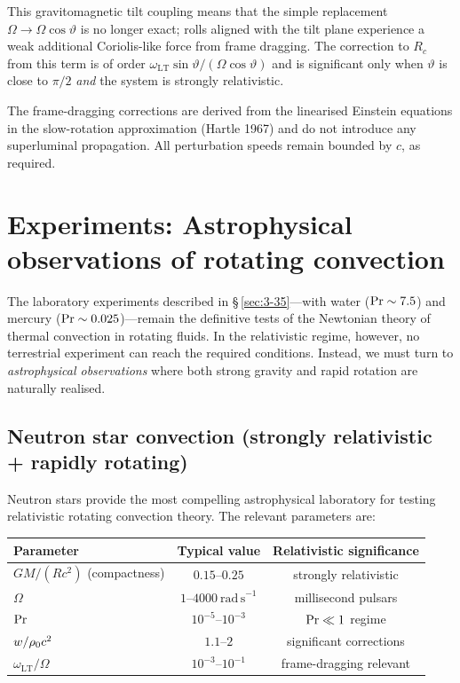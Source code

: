 This gravitomagnetic tilt coupling means that the simple replacement
$\Omega \to \Omega\cos\vartheta$ is no longer exact; rolls aligned with
the tilt plane experience a weak additional Coriolis-like force from
frame dragging.  The correction to $R_c$ from this term is of order
$\omega_{\mathrm{LT}}\sin\vartheta / (\Omega\cos\vartheta)$ and is
significant only when $\vartheta$ is close to $\pi/2$ \emph{and} the
system is strongly relativistic.

\begin{causalitycheck}
The frame-dragging corrections are derived from the linearised Einstein
equations in the slow-rotation approximation (Hartle 1967) and do not
introduce any superluminal propagation.  All perturbation speeds remain
bounded by $c$, as required.
\end{causalitycheck}


\section{Experiments: Astrophysical observations of rotating
convection}\label{sec:rel-3-35}

The laboratory experiments described in \S\,\ref{sec:3-35}---with water
($\mathrm{Pr} \sim 7.5$) and mercury ($\mathrm{Pr} \sim 0.025$)---remain the
definitive tests of the Newtonian theory of thermal convection in
rotating fluids.  In the relativistic regime, however, no terrestrial
experiment can reach the required conditions.  Instead, we must turn to
\emph{astrophysical observations} where both strong gravity and rapid
rotation are naturally realised.

\subsection{Neutron star convection (strongly relativistic + rapidly rotating)}
\label{sec:rel-35a}

Neutron stars provide the most compelling astrophysical laboratory for
testing relativistic rotating convection theory.  The relevant
parameters are:

\begin{center}
\begin{tabular}{lcc}
\hline
Parameter & Typical value & Relativistic significance \\
\hline
$GM/(Rc^2)$ (compactness) & $0.15$--$0.25$ & strongly relativistic \\
$\Omega$ & $1$--$4000~\mathrm{rad\,s}^{-1}$ & millisecond pulsars \\
$\mathrm{Pr}$ & $10^{-5}$--$10^{-3}$ & $\mathrm{Pr} \ll 1$ regime \\
$w/\rho_0 c^2$ & $1.1$--$2$ & significant corrections \\
$\omega_{\mathrm{LT}}/\Omega$ & $10^{-3}$--$10^{-1}$ & frame-dragging relevant \\
\hline
\end{tabular}
\end{center}

